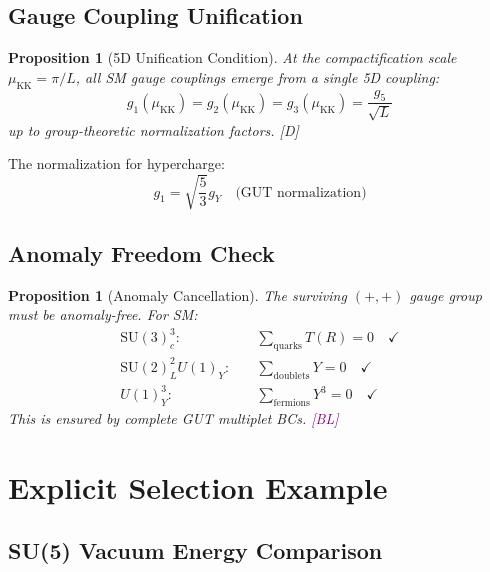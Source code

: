 \documentclass[11pt,a4paper]{article}
\newtheorem{proposition}[theorem]{Proposition}
\newcommand{\tagD}{\textcolor{blue!70!black}{[D]}}
\newcommand{\tagBL}{\textcolor{purple}{[BL]}}
\begin{document}
\subsection{Gauge Coupling Unification}

\begin{proposition}[5D Unification Condition]
\label{prop:unification}
At the compactification scale $\mu_{\text{KK}} = \pi/L$, all SM gauge couplings emerge
from a single 5D coupling:
\begin{equation}
\label{eq:unification}
g_1(\mu_{\text{KK}}) = g_2(\mu_{\text{KK}}) = g_3(\mu_{\text{KK}}) = \frac{g_5}{\sqrt{L}}
\end{equation}
up to group-theoretic normalization factors. \tagD
\end{proposition}

The normalization for hypercharge:
\begin{equation}
\label{eq:hypercharge-norm}
g_1 = \sqrt{\frac{5}{3}} g_Y \quad \text{(GUT normalization)}
\end{equation}

\subsection{Anomaly Freedom Check}

\begin{proposition}[Anomaly Cancellation]
\label{prop:anomaly}
The surviving $(+,+)$ gauge group must be anomaly-free. For SM:
\begin{align}
\label{eq:anom-su3}
\text{SU}(3)_c^3: \quad & \sum_{\text{quarks}} T(R) = 0 \quad \checkmark \\
\label{eq:anom-su2}
\text{SU}(2)_L^2 U(1)_Y: \quad & \sum_{\text{doublets}} Y = 0 \quad \checkmark \\
\label{eq:anom-u1}
U(1)_Y^3: \quad & \sum_{\text{fermions}} Y^3 = 0 \quad \checkmark
\end{align}
This is ensured by complete GUT multiplet BCs. \tagBL
\end{proposition}

\section{Explicit Selection Example}

\subsection{SU(5) Vacuum Energy Comparison}
\end{document}
